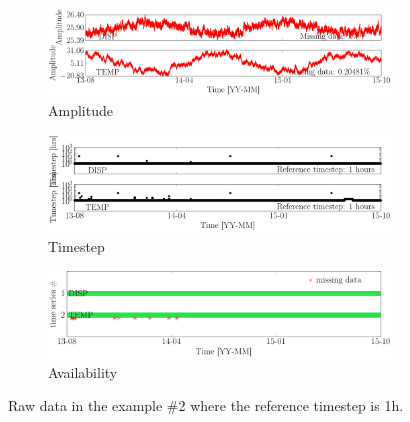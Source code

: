 \begin{figure}[h!]
\centering
\begin{subfigure}{\linewidth}
\centering
\includegraphics[width=0.9\linewidth]{./docfigs/Example_DISPTEMPSIM/raw/ALL_AMPLITUDES.pdf} 
\caption{Amplitude}
\end{subfigure}
\begin{subfigure}{\linewidth}
\centering
\includegraphics[width=0.9\linewidth]{./docfigs/Example_DISPTEMPSIM/raw/ALL_TIMESTEPS.pdf}
\caption{Timestep}
\end{subfigure}
\begin{subfigure}{\linewidth}
\centering
\includegraphics[width=0.9\linewidth]{./docfigs/Example_DISPTEMPSIM/raw/AVAILABILITY.pdf}
\caption{Availability}
\end{subfigure}
\caption{Raw data in the example \#2 where the reference timestep is 1h.}
\label{fig:DataSummaryRaw2}
\end{figure}


